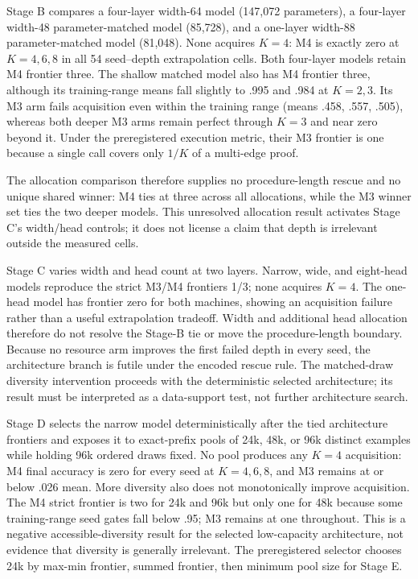 \documentclass[10pt]{article}
\begin{document}
Stage B compares a four-layer width-64 model (147,072 parameters), a four-layer width-48 parameter-matched model (85,728), and a one-layer width-88 parameter-matched model (81,048). None acquires $K=4$: M4 is exactly zero at $K=4,6,8$ in all 54 seed--depth extrapolation cells. Both four-layer models retain M4 frontier three. The shallow matched model also has M4 frontier three, although its training-range means fall slightly to .995 and .984 at $K=2,3$. Its M3 arm fails acquisition even within the training range (means .458, .557, .505), whereas both deeper M3 arms remain perfect through $K=3$ and near zero beyond it. Under the preregistered execution metric, their M3 frontier is one because a single call covers only $1/K$ of a multi-edge proof.

The allocation comparison therefore supplies no procedure-length rescue and no unique shared winner: M4 ties at three across all allocations, while the M3 winner set ties the two deeper models. This unresolved allocation result activates Stage C's width/head controls; it does not license a claim that depth is irrelevant outside the measured cells.

Stage C varies width and head count at two layers. Narrow, wide, and eight-head models reproduce the strict M3/M4 frontiers 1/3; none acquires $K=4$. The one-head model has frontier zero for both machines, showing an acquisition failure rather than a useful extrapolation tradeoff. Width and additional head allocation therefore do not resolve the Stage-B tie or move the procedure-length boundary. Because no resource arm improves the first failed depth in every seed, the architecture branch is futile under the encoded rescue rule. The matched-draw diversity intervention proceeds with the deterministic selected architecture; its result must be interpreted as a data-support test, not further architecture search.

Stage D selects the narrow model deterministically after the tied architecture frontiers and exposes it to exact-prefix pools of 24k, 48k, or 96k distinct examples while holding 96k ordered draws fixed. No pool produces any $K=4$ acquisition: M4 final accuracy is zero for every seed at $K=4,6,8$, and M3 remains at or below .026 mean. More diversity also does not monotonically improve acquisition. The M4 strict frontier is two for 24k and 96k but only one for 48k because some training-range seed gates fall below .95; M3 remains at one throughout. This is a negative accessible-diversity result for the selected low-capacity architecture, not evidence that diversity is generally irrelevant. The preregistered selector chooses 24k by max-min frontier, summed frontier, then minimum pool size for Stage E.
\end{document}
